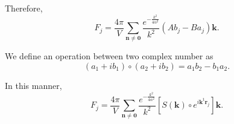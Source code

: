 \documentclass[11pt]{article}
\newcommand{\vt}[1]{\boldsymbol{\mathbf{#1}}}           %
\newcommand{\tr}[1]{#1^\text{t}}                        %
\begin{document}
Therefore,
\begin{equation*}
F_j = \frac{4\pi}{V}\sum_{\vt n \neq \vt 0} \frac{e^{-\frac{k^2}{4\alpha^2}}}{k^2} \left( A b_j - B a_j \right){\vt k}.
\end{equation*}

We define an operation between two complex number as
\begin{equation*}
(a_1 + i b_1)\circ(a_2 + i b_2) = a_1 b_2 - b_1 a_2.
\end{equation*}

In this manner,
\begin{equation*}
F_j = \frac{4\pi}{V}\sum_{\vt n \neq \vt 0} \frac{e^{-\frac{k^2}{4\alpha^2}}}{k^2} \left[ S(\vt k) \circ e^{i\tr{\vt k}{\vt r}_j} \right]{\vt k}.
\end{equation*}
\end{document}
